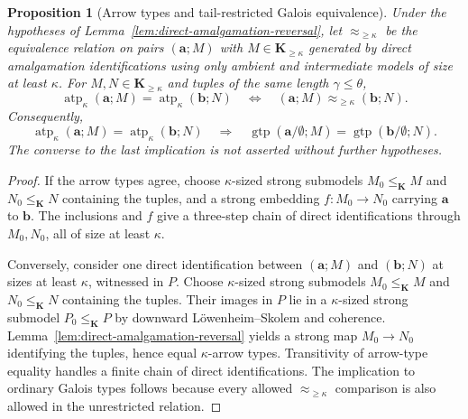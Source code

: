 \documentclass[11pt]{article}
\newcommand{\K}{\mathbf K}
\newcommand{\atp}{\operatorname{atp}}
\newcommand{\gtp}{\operatorname{gtp}}
\newcommand{\ba}{\mathbf{a}}
\newcommand{\bb}{\mathbf{b}}
\theoremstyle{plain}
\newtheorem{proposition}[definition]{Proposition}
\begin{document}
\begin{proposition}[Arrow types and tail-restricted Galois equivalence]
\label{prop:arrow-galois}
Under the hypotheses of Lemma~\ref{lem:direct-amalgamation-reversal},
let $\approx_{\geq\kappa}$ be the equivalence relation
on pairs $(\ba;M)$ with $M\in\K_{\geq\kappa}$
generated by direct amalgamation identifications
\emph{using only ambient and intermediate models
of size at least $\kappa$}.
For $M,N\in\K_{\geq\kappa}$ and tuples of
the same length $\gamma\leq\theta$,
\[
\atp_\kappa(\ba;M)=\atp_\kappa(\bb;N)
\quad\Longleftrightarrow\quad
(\ba;M)\approx_{\geq\kappa}(\bb;N).
\]
Consequently,
\[
\atp_\kappa(\ba;M)=\atp_\kappa(\bb;N)
\quad\Longrightarrow\quad
\gtp(\ba/\emptyset;M)=\gtp(\bb/\emptyset;N).
\]
The converse to the last implication is not
asserted without further hypotheses.
\end{proposition}
\begin{proof}
If the arrow types agree, choose $\kappa$-sized
strong submodels $M_0\leq_\K M$ and
$N_0\leq_\K N$ containing the tuples,
and a strong embedding $f:M_0\to N_0$
carrying $\ba$ to $\bb$. The inclusions
and $f$ give a three-step chain of direct
identifications through $M_0,N_0$, all
of size at least $\kappa$.

Conversely, consider one direct identification
between $(\ba;M)$ and $(\bb;N)$ at sizes
at least $\kappa$, witnessed in $P$.
Choose $\kappa$-sized strong submodels
$M_0\leq_\K M$ and $N_0\leq_\K N$
containing the tuples. Their images in $P$
lie in a $\kappa$-sized strong submodel
$P_0\leq_\K P$ by downward
L\"owenheim--Skolem and coherence.
Lemma~\ref{lem:direct-amalgamation-reversal}
yields a strong map $M_0\to N_0$
identifying the tuples, hence equal
$\kappa$-arrow types. Transitivity of
arrow-type equality handles a finite
chain of direct identifications.
The implication to ordinary Galois types
follows because every allowed
$\approx_{\geq\kappa}$ comparison is also
allowed in the unrestricted relation.
\end{proof}
\end{document}

